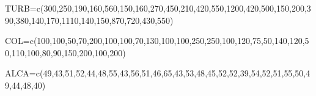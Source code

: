 \documentclass[
  letterpaper,
  DIV=11,
  numbers=noendperiod]{scrartcl}
\newenvironment{Shaded}{\begin{snugshade}}{\end{snugshade}}
\newcommand{\DecValTok}[1]{\textcolor[rgb]{0.68,0.00,0.00}{#1}}
\newcommand{\FunctionTok}[1]{\textcolor[rgb]{0.28,0.35,0.67}{#1}}
\newcommand{\NormalTok}[1]{\textcolor[rgb]{0.00,0.23,0.31}{#1}}
\newcommand{\OtherTok}[1]{\textcolor[rgb]{0.00,0.23,0.31}{#1}}
\begin{document}
\begin{Shaded}
\begin{Highlighting}[]
\NormalTok{TURB}\OtherTok{=}\FunctionTok{c}\NormalTok{(}\DecValTok{300}\NormalTok{,}\DecValTok{250}\NormalTok{,}\DecValTok{190}\NormalTok{,}\DecValTok{160}\NormalTok{,}\DecValTok{560}\NormalTok{,}\DecValTok{150}\NormalTok{,}\DecValTok{160}\NormalTok{,}\DecValTok{270}\NormalTok{,}\DecValTok{450}\NormalTok{,}\DecValTok{210}\NormalTok{,}\DecValTok{420}\NormalTok{,}\DecValTok{550}\NormalTok{,}\DecValTok{1200}\NormalTok{,}\DecValTok{420}\NormalTok{,}\DecValTok{500}\NormalTok{,}\DecValTok{150}\NormalTok{,}\DecValTok{200}\NormalTok{,}\DecValTok{390}\NormalTok{,}\DecValTok{380}\NormalTok{,}\DecValTok{140}\NormalTok{,}\DecValTok{170}\NormalTok{,}\DecValTok{1110}\NormalTok{,}\DecValTok{140}\NormalTok{,}\DecValTok{150}\NormalTok{,}\DecValTok{870}\NormalTok{,}\DecValTok{720}\NormalTok{,}\DecValTok{430}\NormalTok{,}\DecValTok{550}\NormalTok{)}

\NormalTok{COL}\OtherTok{=}\FunctionTok{c}\NormalTok{(}\DecValTok{100}\NormalTok{,}\DecValTok{100}\NormalTok{,}\DecValTok{50}\NormalTok{,}\DecValTok{70}\NormalTok{,}\DecValTok{200}\NormalTok{,}\DecValTok{100}\NormalTok{,}\DecValTok{100}\NormalTok{,}\DecValTok{70}\NormalTok{,}\DecValTok{130}\NormalTok{,}\DecValTok{100}\NormalTok{,}\DecValTok{100}\NormalTok{,}\DecValTok{250}\NormalTok{,}\DecValTok{250}\NormalTok{,}\DecValTok{100}\NormalTok{,}\DecValTok{120}\NormalTok{,}\DecValTok{75}\NormalTok{,}\DecValTok{50}\NormalTok{,}\DecValTok{140}\NormalTok{,}\DecValTok{120}\NormalTok{,}\DecValTok{50}\NormalTok{,}\DecValTok{110}\NormalTok{,}\DecValTok{100}\NormalTok{,}\DecValTok{80}\NormalTok{,}\DecValTok{90}\NormalTok{,}\DecValTok{150}\NormalTok{,}\DecValTok{200}\NormalTok{,}\DecValTok{100}\NormalTok{,}\DecValTok{200}\NormalTok{)}

\NormalTok{ALCA}\OtherTok{=}\FunctionTok{c}\NormalTok{(}\DecValTok{49}\NormalTok{,}\DecValTok{43}\NormalTok{,}\DecValTok{51}\NormalTok{,}\DecValTok{52}\NormalTok{,}\DecValTok{44}\NormalTok{,}\DecValTok{48}\NormalTok{,}\DecValTok{55}\NormalTok{,}\DecValTok{43}\NormalTok{,}\DecValTok{56}\NormalTok{,}\DecValTok{51}\NormalTok{,}\DecValTok{46}\NormalTok{,}\DecValTok{65}\NormalTok{,}\DecValTok{43}\NormalTok{,}\DecValTok{53}\NormalTok{,}\DecValTok{48}\NormalTok{,}\DecValTok{45}\NormalTok{,}\DecValTok{52}\NormalTok{,}\DecValTok{52}\NormalTok{,}\DecValTok{39}\NormalTok{,}\DecValTok{54}\NormalTok{,}\DecValTok{52}\NormalTok{,}\DecValTok{51}\NormalTok{,}\DecValTok{55}\NormalTok{,}\DecValTok{50}\NormalTok{,}\DecValTok{49}\NormalTok{,}\DecValTok{44}\NormalTok{,}\DecValTok{48}\NormalTok{,}\DecValTok{40}\NormalTok{)}


\end{Highlighting}
\end{Shaded}
\end{document}
